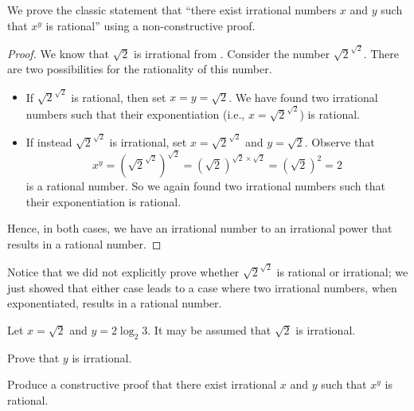 \begin{example}
    We prove the classic statement that ``there exist irrational numbers $x$ and $y$ such that $x^y$ is rational'' using a non-constructive proof.
    \begin{proof}
        We know that $\sqrt2$ is irrational from . Consider the number $\sqrt2^{\sqrt2}$. There are two possibilities for the rationality of this number.
        \begin{itemize}
            \item If $\sqrt2^{\sqrt2}$ is rational, then set $x = y = \sqrt2$. We have found two irrational numbers such that their exponentiation (i.e.,  $x = \sqrt2^{\sqrt2}$) is rational.
            \item If instead $\sqrt2^{\sqrt2}$ is irrational, set $x = \sqrt2^{\sqrt2}$ and $y = \sqrt2$. Observe that
            \[
                x^y = \left(\sqrt2^{\sqrt2}\right)^{\sqrt2} = (\sqrt2)^{\sqrt2 \times \sqrt2} = (\sqrt2)^2 = 2
            \]
            is a rational number. So we again found two irrational numbers such that their exponentiation is rational.
        \end{itemize}
        Hence, in both cases, we have an irrational number to an irrational power that results in a rational number.
    \end{proof}

    Notice that we did not explicitly prove whether $\sqrt2^{\sqrt2}$ is rational or irrational; we just showed that either case leads to a case where two irrational numbers, when exponentiated, results in a rational number.
\end{example}

\begin{exercise}
    Let $x = \sqrt2$ and $y = 2\log_2{3}$. It may be assumed that $\sqrt2$ is irrational.
    \begin{partquestions}{\roman*}
        \item Prove that $y$ is irrational.
        \item Produce a constructive proof that there exist irrational $x$ and $y$ such that $x^y$ is rational.
    \end{partquestions}
\end{exercise}
